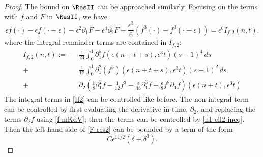 \documentclass[oneside,reqno]{amsart}
\begin{document}
\begin{proof}
	The bound on \(\ResII\) can be approached similarly. Focusing on the terms with \(f\) and \(F\) in \(\ResII\), we have 
	\begin{equation}\label{F-res2}
			\epsilon f(\cdot) - \epsilon f(\cdot - \epsilon) - \epsilon^2 \partial_1 F -\epsilon^4\partial_2 F - \frac{\epsilon^3} 6 (f^3(\cdot) - f^3(\cdot - \epsilon)) = \epsilon^6 I_{f,2}(n,t).
	\end{equation}
	where the integral remainder terms are contained in \(I_{f,2}\):
	\begin{equation}\label{If2}
		\begin{aligned}
			I_{f,2}(n,t) := - & \frac{1} {24} \int_{0}^1 \partial_1^5 f (\epsilon(n+t+s), \epsilon^3 t)(s-1)^4\, ds \\
			+ & \frac{1} {12} \int_0^1 \partial_1^2(f^3)(\epsilon(n+t+s), \epsilon^3 t)(s-1)^2\, ds \\
			+ & \partial_2\left(\frac{1} 8 \partial_1^2 f - \frac{1}{12} f^3  - \frac{\epsilon}{48} \partial_1^3 f + \frac{\epsilon} 8 f^2 \partial_1 f\right)\left(\epsilon(n+t), \epsilon^3 t\right)
		\end{aligned}
	\end{equation}
	The integral terms in \cref{If2} can be controlled like before. The non-integral term can be controlled by first evaluating the derivative in time, \(\partial_2\), and replacing the terms \(\partial_2 f\) using \cref{f-mKdV}; then the terms can be controlled by \cref{h1-ell2-ineq}. Then the left-hand side of \cref{F-res2} can be bounded by a term of the form \[ C \epsilon^{11/2}(\delta + \delta^3).\]
	

\end{proof}
\end{document}
